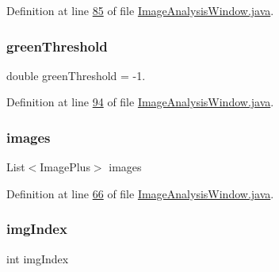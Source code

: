 Definition at line \hyperlink{_image_analysis_window_8java_source_l00085}{85} of file \hyperlink{_image_analysis_window_8java_source}{Image\+Analysis\+Window.\+java}.

\hypertarget{classgui_1_1_image_analysis_window_ad518707968b491c91ef6bb93bcb9c341}{}\label{classgui_1_1_image_analysis_window_ad518707968b491c91ef6bb93bcb9c341} 
\subsubsection{\texorpdfstring{green\+Threshold}{greenThreshold}}
{\footnotesize\ttfamily double green\+Threshold = -\/1.\hspace{0.3cm}{\ttfamily [protected]}}



Definition at line \hyperlink{_image_analysis_window_8java_source_l00094}{94} of file \hyperlink{_image_analysis_window_8java_source}{Image\+Analysis\+Window.\+java}.

\hypertarget{classgui_1_1_image_analysis_window_ab901d2d996b0bf250698c764d1c3949c}{}\label{classgui_1_1_image_analysis_window_ab901d2d996b0bf250698c764d1c3949c} 
\subsubsection{\texorpdfstring{images}{images}}
{\footnotesize\ttfamily List$<$Image\+Plus$>$ images\hspace{0.3cm}{\ttfamily [private]}}



Definition at line \hyperlink{_image_analysis_window_8java_source_l00066}{66} of file \hyperlink{_image_analysis_window_8java_source}{Image\+Analysis\+Window.\+java}.

\hypertarget{classgui_1_1_image_analysis_window_a43531d5121651cc0d006fedbedb03b00}{}\label{classgui_1_1_image_analysis_window_a43531d5121651cc0d006fedbedb03b00} 
\subsubsection{\texorpdfstring{img\+Index}{imgIndex}}
{\footnotesize\ttfamily int img\+Index\hspace{0.3cm}{\ttfamily [private]}}



